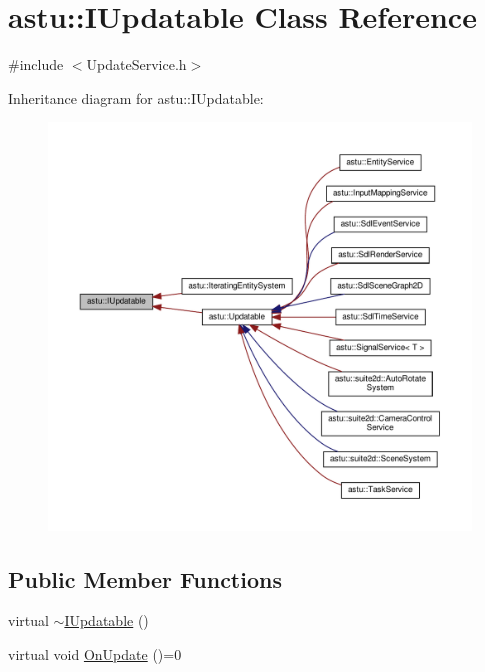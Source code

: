 \hypertarget{classastu_1_1IUpdatable}{}\section{astu\+:\+:I\+Updatable Class Reference}
\label{classastu_1_1IUpdatable}


{\ttfamily \#include $<$Update\+Service.\+h$>$}



Inheritance diagram for astu\+:\+:I\+Updatable\+:\nopagebreak
\begin{figure}[H]
\begin{center}
\leavevmode
\includegraphics[width=350pt]{classastu_1_1IUpdatable__inherit__graph}
\end{center}
\end{figure}
\subsection*{Public Member Functions}
\begin{DoxyCompactItemize}
\item 
virtual \hyperlink{classastu_1_1IUpdatable_ae0ba3ec6b901ef3dd3692471222180e6}{$\sim$\+I\+Updatable} ()
\item 
virtual void \hyperlink{classastu_1_1IUpdatable_a76c7c6e2a71b725bbdbdf6808ef4743f}{On\+Update} ()=0
\end{DoxyCompactItemize}


